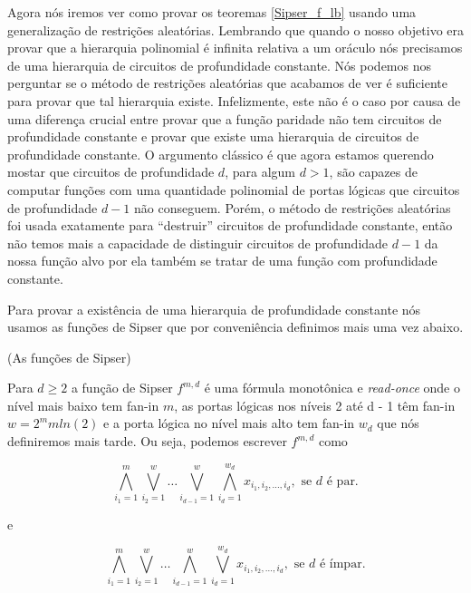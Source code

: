 Agora nós iremos ver como provar os teoremas \ref{Sipser_f_lb} usando uma generalização de restrições aleatórias. Lembrando que quando o nosso objetivo era provar que a hierarquia polinomial é infinita relativa a um oráculo nós precisamos de uma hierarquia de circuitos de profundidade constante. Nós podemos nos perguntar se o método de restrições aleatórias que acabamos de ver é suficiente para provar que tal hierarquia existe. Infelizmente, este não é o caso por causa de uma diferença crucial entre provar que a função paridade não tem circuitos de profundidade constante e provar que existe uma hierarquia de circuitos de profundidade constante. O argumento clássico é que agora estamos querendo mostar que circuitos de profundidade $d$, para algum $d > 1$, são capazes de computar funções com uma quantidade polinomial de portas lógicas que circuitos de profundidade $d - 1$ não conseguem. Porém, o método de restrições aleatórias foi usada exatamente para ``destruir'' circuitos de profundidade constante, então não temos mais a capacidade de distinguir circuitos de profundidade $d - 1$ da nossa função alvo por ela também se tratar de uma função com profundidade constante. 

Para provar a existência de uma hierarquia de profundidade constante nós usamos as funções de Sipser que por conveniência definimos mais uma vez abaixo.

\begin{defi} (As funções de Sipser)

Para $d \geq 2$ a função de Sipser $f^{m, d}$ é uma fórmula monotônica e \emph{read-once} onde o nível mais baixo tem fan-in $m$, as portas lógicas nos níveis 2 até d - 1 têm fan-in $w = 2^{m}mln(2)$ e a porta lógica no nível mais alto tem fan-in $w_{d}$ que nós definiremos mais tarde. Ou seja, podemos escrever $f^{m, d}$ como

\begin{equation} \label{Sipser_f_def_1}
	\bigwedge_{i_{1}  = 1}^{m}\bigvee_{i_{2} = 1}^{w} \dots \bigvee_{i_{d - 1} = 1}^{w} \bigwedge_{i_{d} = 1}^{w_{d}} x_{i_{1}, i_{2}, \dots, i_{d}}, \text{ se } d \text{ é par.}
\end{equation}

e

\begin{equation}
	\bigwedge_{i_{1}  = 1}^{m}\bigvee_{i_{2} = 1}^{w} \dots \bigwedge_{i_{d - 1} = 1}^{w} \bigvee_{i_{d} = 1}^{w_{d}} x_{i_{1}, i_{2}, \dots, i_{d}}, \text{ se } d \text{ é ímpar.}
\end{equation}


\end{defi}

